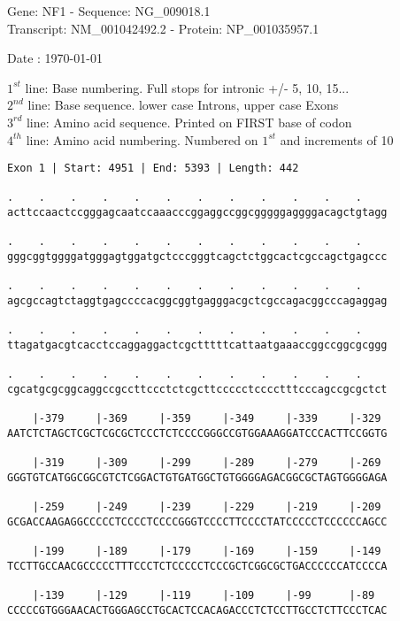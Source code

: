 \documentclass{article}
\begin{document}
\begin{center}
\begin{large}
Gene: NF1 - Sequence: NG\_009018.1\\
Transcript: NM\_001042492.2 - Protein: NP\_001035957.1
 
 Date : \today
\end{large}
\end{center}
$1^{st}$ line: Base numbering. Full stops for intronic +/- 5, 10, 15...\\
$2^{nd}$ line: Base sequence. lower case Introns, upper case Exons\\
$3^{rd}$ line: Amino acid sequence. Printed on FIRST base of codon\\
$4^{th}$ line: Amino acid numbering. Numbered on $1^{st}$ and increments of 10\\
\begin{Verbatim}
Exon 1 | Start: 4951 | End: 5393 | Length: 442
 
.    .    .    .    .    .    .    .    .    .    .    .    
acttccaactccgggagcaatccaaacccggaggccggcgggggaggggacagctgtagg
  
.    .    .    .    .    .    .    .    .    .    .    .    
gggcggtggggatgggagtggatgctcccgggtcagctctggcactcgccagctgagccc
  
.    .    .    .    .    .    .    .    .    .    .    .    
agcgccagtctaggtgagccccacggcggtgagggacgctcgccagacggcccagaggag
  
.    .    .    .    .    .    .    .    .    .    .    .    
ttagatgacgtcacctccaggaggactcgctttttcattaatgaaaccggccggcgcggg
  
.    .    .    .    .    .    .    .    .    .    .    .    
cgcatgcgcggcaggccgccttccctctcgcttccccctcccctttcccagccgcgctct
  
    |-379     |-369     |-359     |-349     |-339     |-329 
AATCTCTAGCTCGCTCGCGCTCCCTCTCCCCGGGCCGTGGAAAGGATCCCACTTCCGGTG
  
    |-319     |-309     |-299     |-289     |-279     |-269 
GGGTGTCATGGCGGCGTCTCGGACTGTGATGGCTGTGGGGAGACGGCGCTAGTGGGGAGA
  
    |-259     |-249     |-239     |-229     |-219     |-209 
GCGACCAAGAGGCCCCCTCCCCTCCCCGGGTCCCCTTCCCCTATCCCCCTCCCCCCAGCC
  
    |-199     |-189     |-179     |-169     |-159     |-149 
TCCTTGCCAACGCCCCCTTTCCCTCTCCCCCTCCCGCTCGGCGCTGACCCCCCATCCCCA
  
    |-139     |-129     |-119     |-109     |-99      |-89  
CCCCCGTGGGAACACTGGGAGCCTGCACTCCACAGACCCTCTCCTTGCCTCTTCCCTCAC
  

\end{Verbatim}
\end{document}
